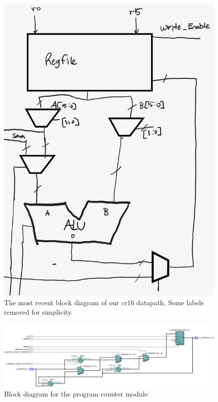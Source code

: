 \documentclass[conference]{IEEEtran}
\begin{document}
\begin{figure}[ht]
    \centering
    \includegraphics[scale=0.55]{resources/figures/datapath.jpg}
    \caption{The most recent block diagram of our cr16 datapath. Some labels removed for simplicity.}
    \label{fig:datapath}
\end{figure}

\begin{figure}[t]
    \centering
    \includegraphics[scale=0.5]{resources/figures/program_counter.jpg}
    \caption{Block diagram for the program counter module}
    \label{fig:program_counter}
\end{figure}
\end{document}
